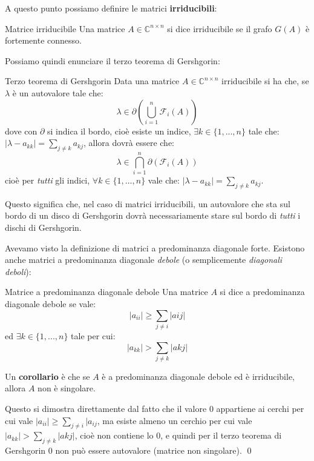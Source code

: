\documentclass[a4paper,11pt]{article}
\begin{document}
A questo punto possiamo definire le matrici \textbf{irriducibili}:
\begin{definition}{Matrice irriducibile}
	Una matrice $A \in \mathbb{C}^{n \times n}$ si dice irriducibile se il grafo $G(A)$ è fortemente connesso.
\end{definition}

Possiamo quindi enunciare il terzo teorema di Gershgorin:
\begin{theorem}{Terzo teorema di Gershgorin}
	Data una matrice $A \in \mathbb{C}^{n \times n}$ irriducibile si ha che, se $\lambda$ è un autovalore tale che:
	$$
		\lambda \in \partial \left( \bigcup_{i = 1}^n \mathcal{F}_i(A) \right)
	$$
	dove con $\partial$ si indica il bordo, cioè esiste un indice, $\exists k \in \{ 1, ..., n \}$ tale che:
	$
	|\lambda - a_{kk}| = \sum_{j \neq k} a_{kj}
	$,
	allora dovrà essere che:
	$$
		\lambda \in \bigcap_{i = 1}^n \partial \left( \mathcal{F}_i(A) \right)
	$$
	cioè per \textit{tutti} gli indici, $\forall k \in \{ 1, ..., n \}$ vale che:
	$
	|\lambda - a_{kk}| = \sum_{j \neq k} a_{kj}
	$.

\end{theorem}

Questo significa che, nel caso di matrici irriducibili, un autovalore che sta sul bordo di un disco di Gershgorin dovrà necessariamente stare sul bordo di \textit{tutti} i dischi di Gershgorin.

Avevamo visto la definizione di matrici a predominanza diagonale forte.
Esistono anche matrici a predominanza diagonale \textit{debole} (o semplicemente \textit{diagonali deboli}):
\begin{definition}{Matrice a predominanza diagonale debole}
	Una matrice $A$ si dice a predominanza diagonale debole se vale:
	$$
	|a_{ii}| \geq \sum_{j \neq i} |a{ij}|
	$$
	ed $\exists k \in \{ 1, ..., n \}$ tale per cui:
	$$
	|a_{kk}| > \sum_{j \neq k} |a{kj}|
	$$
\end{definition}

Un \textbf{corollario} è che se $A$ è a predominanza diagonale debole ed è irriducibile, allora $A$ non è singolare.

Questo si dimostra direttamente dal fatto che il valore $0$ appartiene ai cerchi per cui vale $|a_{ii}| \geq \sum_{j \neq i} |a_{ij}$, ma esiste almeno un cerchio per cui vale $|a_{kk}| > \sum_{j \neq k} |a{kj}|$, cioè non contiene lo $0$, e quindi per il terzo teorema di Gershgorin $0$ non può essere autovalore (matrice non singolare). \qed
\end{document}
